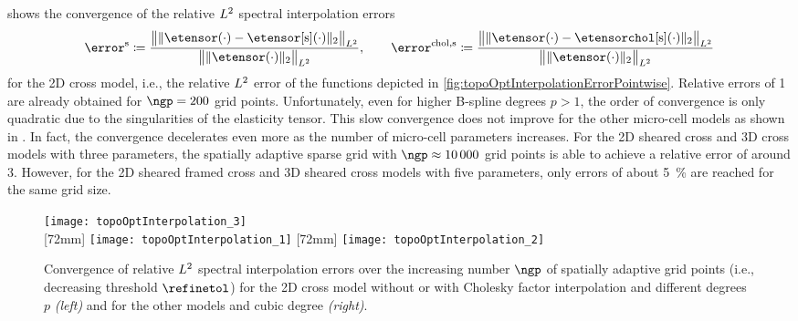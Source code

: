  shows
the convergence of the relative $L^2$ spectral interpolation errors
\begin{equation}
  \error^{\sparse} \ceq
  \frac{
    \normLtwoscaled{
      \vphantom{\big(}
      \norm[2]{\etensor({\cdot}) - \etensorintp({\cdot})}
    }
  }{
    \normLtwoscaled{
      \vphantom{\big(}
      \norm[2]{\etensor({\cdot})}
    }
  }, \qquad
  \error^{\chol,\sparse} \ceq
  \frac{
    \normLtwoscaled{
      \vphantom{\big(}
      \norm[2]{\etensor({\cdot}) - \etensorcholintp({\cdot})}
    }
  }{
    \normLtwoscaled{
      \vphantom{\big(}
      \norm[2]{\etensor({\cdot})}
    }
  }
\end{equation}
for the 2D cross model, i.e.,
the relative $L^2$ error of the functions depicted in
\cref{fig:topoOptInterpolationErrorPointwise}.
Relative errors of \SI{1}{\permille} are already obtained
for $\ngp = 200$ grid points.
Unfortunately, even for higher B-spline degrees $p > 1$,
the order of convergence is only quadratic
due to the singularities of the elasticity tensor.
This slow convergence does not improve for the other
micro-cell models as shown in
.
In fact, the convergence decelerates even more
as the number of micro-cell parameters increases.
For the 2D sheared cross and 3D cross models with three parameters,
the spatially adaptive sparse grid with $\ngp \approx \num{10000}$ grid points
is able to achieve a relative error of around \SI{3}{\permille}.
However, for the 2D sheared framed cross and 3D sheared cross models
with five parameters, only errors of about \SI{5}{\percent} are reached
for the same grid size.

\begin{figure}
  \hspace*{5mm}%
  \texttt{[image: topoOptInterpolation\_3]}%
  \hfill%
  \\[2mm]%
  [72mm]{%
    \texttt{[image: topoOptInterpolation\_1]}%
  }%
  \hfill%
  [72mm]{%
    \texttt{[image: topoOptInterpolation\_2]}%
  }%
  \caption[Convergence of relative $L^2$ spectral interpolation errors]{%
    Convergence of relative $L^2$ spectral interpolation errors
    over the increasing number $\ngp$ of spatially adaptive grid points
    (i.e., decreasing threshold $\refinetol$)
    for the 2D cross model without or with Cholesky factor interpolation
    and different degrees $p$ \emph{(left)} and
    for the other models and cubic degree \emph{(right)}.%
  }%
  \label{fig:topoOptInterpolationErrorBasisFunctions}%
\end{figure}




